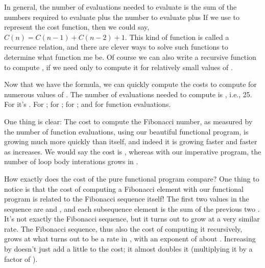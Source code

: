 \documentclass[letterpaper,10pt,english]{sphinxmanual}
\begin{document}
In general, the number of evaluations needed to evaluate  is
the sum of the numbers required to evaluate  plus the number
to evaluate  plus  If we use  to represent the cost
function, then we could say, \(C(n) = C(n-1) + C(n-2) + 1\). This
kind of function is called a recurrence relation, and there are clever
ways to solve such functions to determine what function  me be. Of
course we can also write a recursive function to compute , if
we need only to compute it for relatively small values of .

Now that we have the formula, we can quickly compute the costs to
compute  for numerous values of . The number of evaluations
needed to compute  is , i.e., 25. For 
it’s .  For ; for ; for ;
and for  function evaluations.

One thing is clear: The cost to compute the  Fibonacci number,
as measured by the number of function evaluations, using our beautiful
functional program, is growing much more quickly than  itself, and
indeed it is growing faster and faster as  increases. We would say
the cost is , whereas with our imperative program, the
number of loop body interations grows  in .

How exactly does the cost of the pure functional program compare? One
thing to notice is that the cost of computing a Fibonacci element with
our functional program is related to the Fibonacci sequence itself!
The first two values in the  sequence are  and , and each
subsequence element is the sum of the previous two .  It’s not
exactly the Fibonacci sequence, but it turns out to grow at a very
similar rate. The Fibonacci sequence, thus also the cost of computing
it recursively, grows at what turns out to be a rate  in
, with an exponent of about . Increasing  by  doesn’t
just add a little to the cost; it almost doubles it (multiplying it by
a factor of ).
\end{document}
